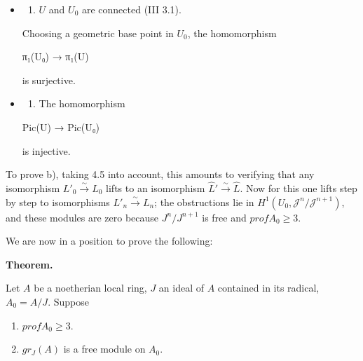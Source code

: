 \documentclass[
  11pt,
  a4paper,
]{book}
\newenvironment{Shaded}{}{}
\newcommand{\NormalTok}[1]{#1}
\providecommand{\tightlist}{%
  \setlength{\itemsep}{0pt}\setlength{\parskip}{0pt}}
\begin{document}
\begin{itemize}
\item
  \begin{enumerate}
  \def\labelenumi{\alph{enumi})}
  \tightlist
  \item
    \(U\) and \(U_{0}\) are connected (III 3.1).
  \end{enumerate}

  Choosing a geometric base point in \(U_{0}\), the homomorphism

\begin{Shaded}
\begin{Highlighting}[]
\NormalTok{π₁(U₀) → π₁(U)}
\end{Highlighting}
\end{Shaded}

  is surjective.
\item
  \begin{enumerate}
  \def\labelenumi{\alph{enumi})}
  \setcounter{enumi}{1}
  \tightlist
  \item
    The homomorphism
  \end{enumerate}

\begin{Shaded}
\begin{Highlighting}[]
\NormalTok{Pic(U) → Pic(U₀)}
\end{Highlighting}
\end{Shaded}

  is injective.
\end{itemize}

To prove b), taking 4.5 into account, this amounts to verifying that any
isomorphism \(L'_{0} \xrightarrow{\sim} L_{0}\) lifts to an isomorphism
\(\hat{L}' \xrightarrow{\sim} \hat{L}\). Now for this one lifts step by
step to isomorphisms \(L'_{n} \xrightarrow{\sim} L_{n}\); the
obstructions lie in \(H^{1}(U_{0}, \mathcal{J}^{n}/\mathcal{J}^{n+1})\),
and these modules are zero because \(J^{n}/J^{n+1}\) is free and
\(prof A_{0} \geqslant 3\).

We are now in a position to prove the following:

\textbf{Theorem.}

Let \(A\) be a noetherian local ring, \(J\) an ideal of \(A\) contained
in its radical, \(A_{0} = A/J\). Suppose

\begin{enumerate}
\def\labelenumi{\arabic{enumi}.}
\tightlist
\item
  \(prof A_{0} \geqslant 3\).
\item
  \(gr_{J}(A)\) is a free module on \(A_{0}\).
\end{enumerate}
\end{document}
